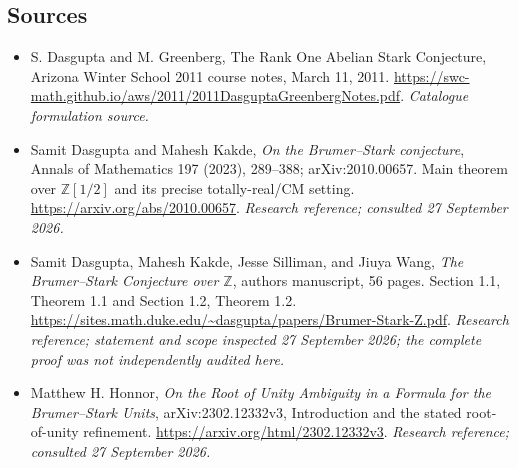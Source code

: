 \documentclass[11pt,a4paper]{article}
\newcommand{\Z}{\mathbb{Z}}
\numberwithin{equation}{section}
\begin{document}
\subsection{Sources}
\begin{itemize}\raggedright
\item[\textnormal{[S1]}]\hypertarget{source:198:1}{} S. Dasgupta and M. Greenberg, The Rank One Abelian Stark Conjecture, Arizona Winter School 2011 course notes, March 11, 2011.
\url{https://swc-math.github.io/aws/2011/2011DasguptaGreenbergNotes.pdf}.
{\small\textit{Catalogue formulation source.}}
\item[\textnormal{[E1]}]\hypertarget{extra:198:1}{} Samit Dasgupta and Mahesh Kakde, \emph{On the Brumer--Stark conjecture}, Annals of Mathematics 197 (2023), 289--388; arXiv:2010.00657. Main theorem over $\Z[1/2]$ and its precise totally-real/CM setting.
\url{https://arxiv.org/abs/2010.00657}.
{\small\textit{Research reference; consulted 27 September 2026.}}
\item[\textnormal{[E2]}]\hypertarget{extra:198:2}{} Samit Dasgupta, Mahesh Kakde, Jesse Silliman, and Jiuya Wang, \emph{The Brumer--Stark Conjecture over $\Z$}, authors\textquotesingle{} manuscript, 56 pages. Section 1.1, Theorem 1.1 and Section 1.2, Theorem 1.2.
\url{https://sites.math.duke.edu/~dasgupta/papers/Brumer-Stark-Z.pdf}.
{\small\textit{Research reference; statement and scope inspected 27 September 2026; the complete proof was not independently audited here.}}
\item[\textnormal{[E3]}]\hypertarget{extra:198:3}{} Matthew H. Honnor, \emph{On the Root of Unity Ambiguity in a Formula for the Brumer--Stark Units}, arXiv:2302.12332v3, Introduction and the stated root-of-unity refinement.
\url{https://arxiv.org/html/2302.12332v3}.
{\small\textit{Research reference; consulted 27 September 2026.}}
\end{itemize}
\end{document}
